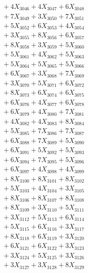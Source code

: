 \documentclass[a4paper,10pt]{article}
\begin{document}
{\begin{align}
&\;  + 4 X_{3046} + 4 X_{3047} + 6 X_{3048} \\[0.3ex]
&\;  + 7 X_{3049} + 3 X_{3050} + 7 X_{3051} \\[0.3ex]
&\;  + 5 X_{3052} + 6 X_{3053} + 4 X_{3054} \\[0.3ex]
&\;  + 3 X_{3055} + 8 X_{3056} + 6 X_{3057} \\[0.3ex]
&\;  + 8 X_{3058} + 3 X_{3059} + 5 X_{3060} \\[0.3ex]
&\;  + 5 X_{3061} + 4 X_{3062} + 5 X_{3063} \\[0.3ex]
&\;  + 5 X_{3064} + 5 X_{3065} + 5 X_{3066} \\[0.3ex]
&\;  + 6 X_{3067} + 3 X_{3068} + 7 X_{3069} \\[0.5ex]\allowbreak
&\;  + 3 X_{3070} + 5 X_{3071} + 6 X_{3072} \\[0.3ex]
&\;  + 8 X_{3073} + 6 X_{3074} + 6 X_{3075} \\[0.3ex]
&\;  + 6 X_{3076} + 4 X_{3077} + 6 X_{3078} \\[0.3ex]
&\;  + 6 X_{3079} + 4 X_{3080} + 7 X_{3081} \\[0.3ex]
&\;  + 4 X_{3082} + 4 X_{3083} + 8 X_{3084} \\[0.3ex]
&\;  + 5 X_{3085} + 7 X_{3086} + 7 X_{3087} \\[0.3ex]
&\;  + 6 X_{3088} + 7 X_{3089} + 5 X_{3090} \\[0.3ex]
&\;  + 6 X_{3091} + 5 X_{3092} + 5 X_{3093} \\[0.3ex]
&\;  + 6 X_{3094} + 7 X_{3095} + 5 X_{3096} \\[0.3ex]
&\;  + 6 X_{3097} + 4 X_{3098} + 4 X_{3099} \\[0.5ex]\allowbreak
&\;  + 8 X_{3100} + 8 X_{3101} + 8 X_{3102} \\[0.3ex]
&\;  + 5 X_{3103} + 4 X_{3104} + 3 X_{3105} \\[0.3ex]
&\;  + 8 X_{3106} + 8 X_{3107} + 8 X_{3108} \\[0.3ex]
&\;  + 8 X_{3109} + 3 X_{3110} + 5 X_{3111} \\[0.3ex]
&\;  + 3 X_{3112} + 5 X_{3113} + 6 X_{3114} \\[0.3ex]
&\;  + 5 X_{3115} + 6 X_{3116} + 3 X_{3117} \\[0.3ex]
&\;  + 8 X_{3118} + 6 X_{3119} + 3 X_{3120} \\[0.3ex]
&\;  + 6 X_{3121} + 6 X_{3122} + 3 X_{3123} \\[0.3ex]
&\;  + 3 X_{3124} + 5 X_{3125} + 3 X_{3126} \\[0.3ex]
&\;  + 3 X_{3127} + 3 X_{3128} + 8 X_{3129} \\[0.5ex]\allowbreak

\end{align}}
\end{document}
